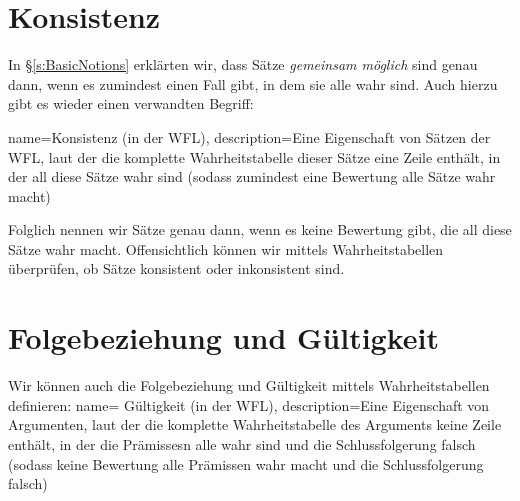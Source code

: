 \section{Konsistenz}
In \S\ref{s:BasicNotions} erklärten wir, dass Sätze \emph{gemeinsam möglich} sind genau dann, wenn es zumindest einen Fall gibt, in dem sie alle wahr sind. Auch hierzu gibt es wieder einen verwandten Begriff:

{
  name=Konsistenz (in der WFL),
description={Eine Eigenschaft von Sätzen der WFL, laut der die \gls{komplette Wahrheitstabelle} dieser Sätze eine Zeile enthält, in der all diese Sätze wahr sind (sodass zumindest eine \gls{Bewertung} alle Sätze wahr macht)}
}

Folglich nennen wir Sätze  genau dann, wenn es keine Bewertung gibt, die all diese Sätze wahr macht. Offensichtlich können wir mittels Wahrheitstabellen überprüfen, ob Sätze konsistent oder inkonsistent sind.

\section{Folgebeziehung und Gültigkeit}
Wir können auch die Folgebeziehung und Gültigkeit mittels Wahrheitstabellen definieren:
{
  name= Gültigkeit (in der WFL),
description={Eine Eigenschaft von Argumenten, laut der die \gls{komplette Wahrheitstabelle} des Arguments keine Zeile enthält, in der die \glspl{Prämisse}n alle wahr sind und die \gls{Schlussfolgerung} falsch (sodass keine \gls{Bewertung} alle Prämissen wahr macht und die Schlussfolgerung falsch)}
}

